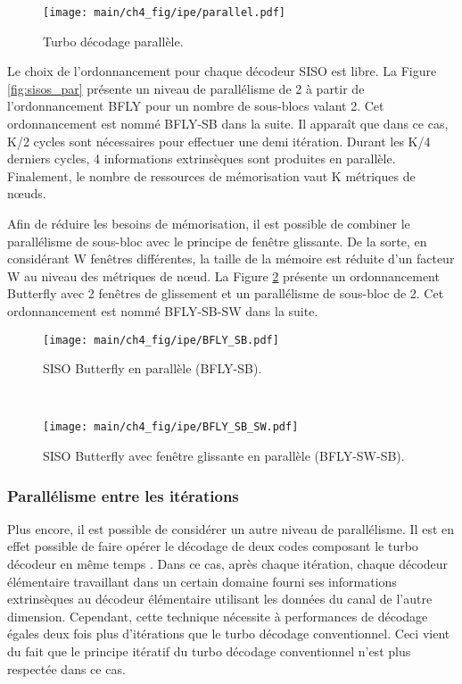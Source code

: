 \begin{figure}[!h]
	\centering
	\texttt{[image: main/ch4\_fig/ipe/parallel.pdf]}
	\caption{Turbo décodage parallèle. \label{fig:turbo_par}}
\end{figure} 

Le choix de l'ordonnancement pour chaque décodeur SISO est libre. La Figure \ref{fig:sisos_par} présente un niveau de 
parallélisme de 2 à partir de l'ordonnancement BFLY pour un nombre de sous-blocs valant 2. Cet ordonnancement est nommé BFLY-SB dans la suite. Il apparaît que dans ce cas, K/2 cycles sont nécessaires pour effectuer une demi itération. 
Durant les K/4 derniers cycles, 4 informations extrinsèques sont produites en parallèle. Finalement, le nombre de
ressources de mémorisation vaut K métriques de nœuds.

Afin de réduire les besoins de mémorisation, il est possible de combiner le parallélisme de sous-bloc avec le principe 
de fenêtre glissante. De la sorte, en considérant W fenêtres différentes, la taille de la mémoire est réduite d'un 
facteur W au niveau des métriques de nœud. La Figure \ref{fig:sisos_par_sb} présente un ordonnancement Butterfly avec 
2 fenêtres de glissement et un parallélisme de sous-bloc de 2. Cet ordonnancement est nommé BFLY-SB-SW dans la suite.

\begin{figure}[!h]
    \centering
    \begin{minipage}[t]{.49\textwidth}
        \centering
        \texttt{[image: main/ch4\_fig/ipe/BFLY\_SB.pdf]}
		\caption{SISO Butterfly en parallèle (BFLY-SB). \label{fig:sisos_par}}
    \end{minipage}~~~~~~%
    \begin{minipage}[t]{0.49\textwidth}
        \centering
        \texttt{[image: main/ch4\_fig/ipe/BFLY\_SB\_SW.pdf]}
		\caption{SISO Butterfly avec fenêtre glissante en parallèle (BFLY-SW-SB). \label{fig:sisos_par_sb}}
    \end{minipage}
\end{figure}

\subsubsection{Parallélisme entre les itérations}
Plus encore, il est possible de considérer un autre niveau de parallélisme. Il est en effet possible de faire opérer le 
décodage de deux codes composant le turbo décodeur en même temps \cite{turbo_par}. Dans ce cas, après chaque itération, 
chaque décodeur élémentaire travaillant dans un certain domaine fourni ses informations extrinsèques au décodeur 
élémentaire utilisant les données du canal de l'autre dimension. Cependant, cette technique nécessite à performances de 
décodage égales deux fois plus d'itérations que le turbo décodage conventionnel. Ceci vient du fait que le principe itératif du turbo décodage conventionnel n'est plus respectée dans ce cas.

